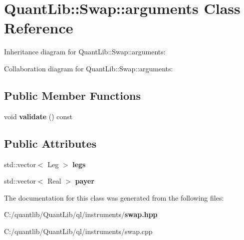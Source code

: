 \section{Quant\+Lib\+:\+:Swap\+:\+:arguments Class Reference}
\label{class_quant_lib_1_1_swap_1_1arguments}


Inheritance diagram for Quant\+Lib\+:\+:Swap\+:\+:arguments\+:


Collaboration diagram for Quant\+Lib\+:\+:Swap\+:\+:arguments\+:
\subsection*{Public Member Functions}
\begin{DoxyCompactItemize}
\item 
void {\bfseries validate} () const \label{class_quant_lib_1_1_swap_1_1arguments_acb382c6032f5088443eafc8a60c7d0eb}

\end{DoxyCompactItemize}
\subsection*{Public Attributes}
\begin{DoxyCompactItemize}
\item 
std\+::vector$<$ Leg $>$ {\bfseries legs}\label{class_quant_lib_1_1_swap_1_1arguments_a2c3064231431edec4ee5462a383b2694}

\item 
std\+::vector$<$ Real $>$ {\bfseries payer}\label{class_quant_lib_1_1_swap_1_1arguments_a06455c2e4b57d85c8ec4b85a1641ce71}

\end{DoxyCompactItemize}


The documentation for this class was generated from the following files\+:\begin{DoxyCompactItemize}
\item 
C\+:/quantlib/\+Quant\+Lib/ql/instruments/{\bf swap.\+hpp}\item 
C\+:/quantlib/\+Quant\+Lib/ql/instruments/swap.\+cpp\end{DoxyCompactItemize}
